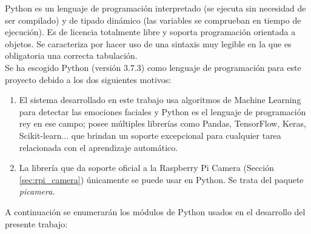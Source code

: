 Python es un lenguaje de programación interpretado (se ejecuta sin necesidad de ser compilado) y de tipado dinámico (las variables se comprueban en tiempo de ejecución). Es de licencia totalmente libre y soporta programación orientada a objetos. Se caracteriza por hacer uso de una sintaxis muy legible en la que es obligatoria una correcta tabulación.\\

Se ha escogido Python (versión 3.7.3) como lenguaje de programación para este proyecto debido a los dos siguientes motivos:

\begin{enumerate}
    \item El sistema desarrollado en este trabajo usa algoritmos de Machine Learning para detectar las emociones faciales y Python es el lenguaje de programación rey en ese campo; posee múltiples librerías como Pandas, TensorFlow, Keras, Scikit-learn... que brindan un soporte excepcional para cualquier tarea relacionada con el aprendizaje automático.
    
    \item La librería que da soporte oficial a la Raspberry Pi Camera (Sección \ref{sec:rpi_camera}) únicamente se puede usar en Python. Se trata del paquete \textit{picamera}.
\end{enumerate}

A continuación se enumerarán los módulos de Python usados en el desarrollo del presente trabajo:

